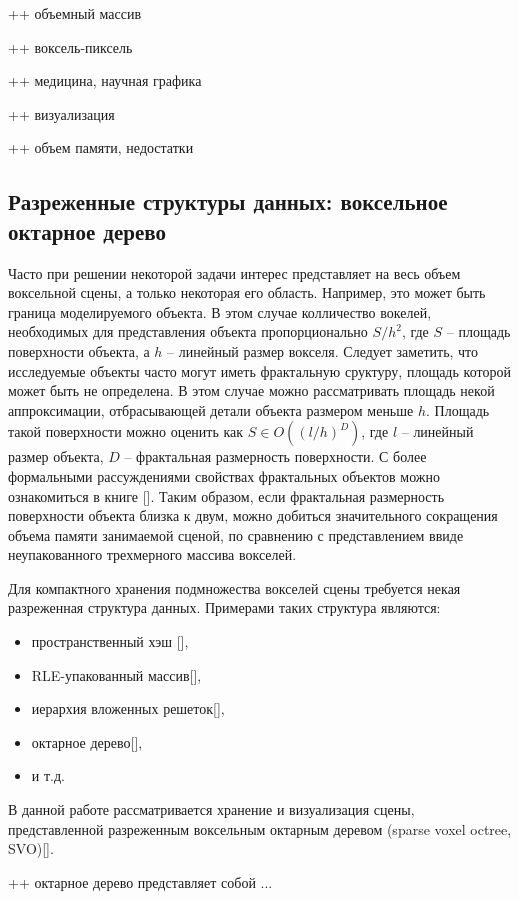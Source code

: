 ++ объемный массив

++ воксель-пиксель

++ медицина, научная графика

++ визуализация

++ объем памяти, недостатки

\subsection{Разреженные структуры данных: воксельное октарное дерево}

Часто при решении некоторой задачи интерес представляет на весь объем воксельной сцены, а только некоторая его область. Например, это может быть граница моделируемого объекта. В этом случае колличество вокелей, необходимых для представления объекта пропорционально $S/h^2$, где $S$ -- площадь поверхности объекта, а $h$ -- линейный размер вокселя. Следует заметить, что исследуемые объекты часто могут иметь фрактальную сруктуру, площадь которой может быть не определена. В этом случае можно рассматривать площадь некой аппроксимации, отбрасывающей детали объекта размером меньше $h$. Площадь такой поверхности можно оценить как $S \in O((l/ h)^D)$, где $l$ -- линейный размер объекта, $D$ -- фрактальная размерность поверхности. С более формальными рассуждениями свойствах фрактальных объектов можно ознакомиться в книге [].
Таким образом, если фрактальная размерность поверхности объекта близка к двум, можно добиться значительного сокращения объема памяти занимаемой сценой, по сравнению с представлением ввиде неупакованного трехмерного массива вокселей.

Для компактного хранения подмножества вокселей сцены требуется некая разреженная структура данных. Примерами таких структура являются:

\begin{itemize}
\item пространственный хэш [],
\item RLE-упакованный массив[],
\item иерархия вложенных решеток[],
\item октарное дерево[], 
\item и т.д.
\end{itemize}

В данной работе рассматривается хранение и визуализация сцены, представленной разреженным воксельным октарным деревом (sparse voxel octree, SVO)[]. 

++ октарное дерево представляет собой ...

